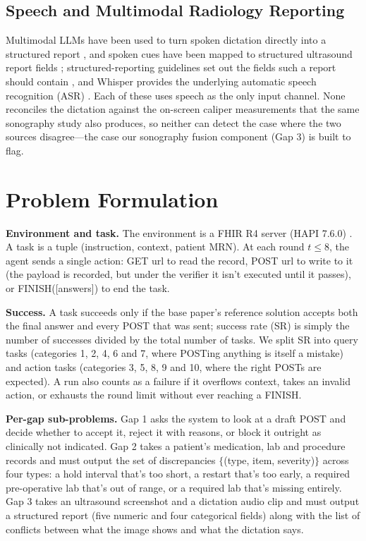 \documentclass[conference]{IEEEtran}
\begin{document}
\subsection{Speech and Multimodal Radiology Reporting}
Multimodal LLMs have been used to turn spoken dictation directly into a structured report \cite{gertz2026dictation}, and spoken cues have been mapped to structured ultrasound report fields \cite{hao2026ultrareporter}; structured-reporting guidelines set out the fields such a report should contain \cite{esr2018structured}, and Whisper provides the underlying automatic speech recognition (ASR) \cite{radford2023whisper}. Each of these uses speech as the only input channel. None reconciles the dictation against the on-screen caliper measurements that the same sonography study also produces, so neither can detect the case where the two sources disagree---the case our sonography fusion component (Gap 3) is built to flag.

\section{Problem Formulation}\label{sec:problem}

\textbf{Environment and task.} The environment is a FHIR R4 server (HAPI 7.6.0) \cite{bender2013fhir,mandel2016smart}. A task is a tuple (instruction, context, patient MRN). At each round $t \leq 8$, the agent sends a single action: GET url to read the record, POST url to write to it (the payload is recorded, but under the verifier it isn't executed until it passes), or FINISH([answers]) to end the task.

\textbf{Success.} A task succeeds only if the base paper's reference solution accepts both the final answer and every POST that was sent; success rate (SR) is simply the number of successes divided by the total number of tasks. We split SR into query tasks (categories 1, 2, 4, 6 and 7, where POSTing anything is itself a mistake) and action tasks (categories 3, 5, 8, 9 and 10, where the right POSTs are expected). A run also counts as a failure if it overflows context, takes an invalid action, or exhausts the round limit without ever reaching a FINISH.

\textbf{Per-gap sub-problems.} Gap 1 asks the system to look at a draft POST and decide whether to accept it, reject it with reasons, or block it outright as clinically not indicated. Gap 2 takes a patient's medication, lab and procedure records and must output the set of discrepancies $\{$(type, item, severity)$\}$ across four types: a hold interval that's too short, a restart that's too early, a required pre-operative lab that's out of range, or a required lab that's missing entirely. Gap 3 takes an ultrasound screenshot and a dictation audio clip and must output a structured report (five numeric and four categorical fields) along with the list of conflicts between what the image shows and what the dictation says.
\end{document}
